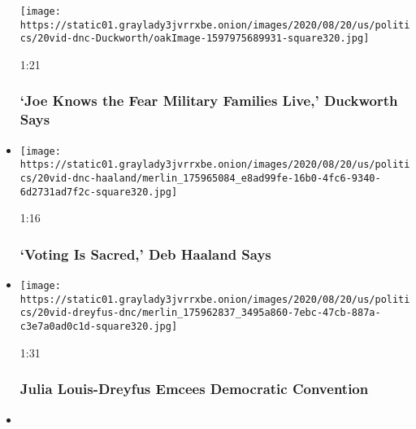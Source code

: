 \begin{itemize}
  \texttt{[image: https://static01.graylady3jvrrxbe.onion/images/2020/08/20/us/politics/20vid-dnc-Duckworth/oakImage-1597975689931-square320.jpg]}

  1:21

  \hypertarget{joe-knows-the-fear-military-families-live-duckworth-says}{%
  \subsubsection{`Joe Knows the Fear Military Families Live,' Duckworth
  Says}\label{joe-knows-the-fear-military-families-live-duckworth-says}}
\item
  \href{https://www.nytimes3xbfgragh.onion/video/us/elections/100000007299756/deb-haaland-speaks-dnc.html?action=click\&module=video-series-bar\&region=header\&pgtype=Article\&playlistId=video/latest-video}{}

  \texttt{[image: https://static01.graylady3jvrrxbe.onion/images/2020/08/20/us/politics/20vid-dnc-haaland/merlin\_175965084\_e8ad99fe-16b0-4fc6-9340-6d2731ad7f2c-square320.jpg]}

  1:16

  \hypertarget{voting-is-sacred-deb-haaland-says}{%
  \subsubsection{`Voting Is Sacred,' Deb Haaland
  Says}\label{voting-is-sacred-deb-haaland-says}}
\item
  \href{https://www.nytimes3xbfgragh.onion/video/us/elections/100000007299846/julia-louis-dreyfus-speaks-dnc.html?action=click\&module=video-series-bar\&region=header\&pgtype=Article\&playlistId=video/latest-video}{}

  \texttt{[image: https://static01.graylady3jvrrxbe.onion/images/2020/08/20/us/politics/20vid-dreyfus-dnc/merlin\_175962837\_3495a860-7ebc-47cb-887a-c3e7a0ad0c1d-square320.jpg]}

  1:31

  \hypertarget{julia-louis-dreyfus-emcees-democratic-convention}{%
  \subsubsection{Julia Louis-Dreyfus Emcees Democratic
  Convention}\label{julia-louis-dreyfus-emcees-democratic-convention}}
\item
  \href{https://www.nytimes3xbfgragh.onion/video/us/elections/100000007299826/keisha-lance-bottoms-speaks-dnc.html?action=click\&module=video-series-bar\&region=header\&pgtype=Article\&playlistId=video/latest-video}{}


\end{itemize}
